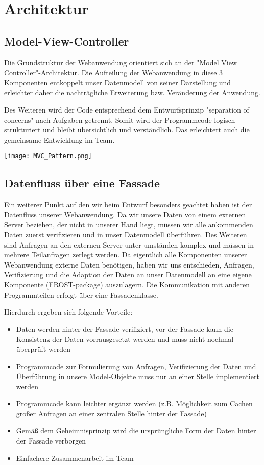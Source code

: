 \section{Architektur}

\subsection{Model-View-Controller}
Die Grundstruktur der Webanwendung orientiert sich an der "Model View Controller"-Architektur. Die Aufteilung der Webanwendung in diese 3 Komponenten entkoppelt unser Datenmodell von seiner Darstellung und erleichter daher die nachträgliche Erweiterung bzw. Veränderung der Anwendung.

Des Weiteren wird der Code entsprechend dem Entwurfsprinzip "separation of concerns" nach Aufgaben getrennt. Somit wird der Programmcode logisch strukturiert und bleibt übersichtlich und verständlich. Das erleichtert auch die gemeinsame Entwicklung im Team.

\vspace{5mm}

\texttt{[image: MVC\_Pattern.png]}

\newpage

\subsection{Datenfluss über eine Fassade}
Ein weiterer Punkt auf den wir beim Entwurf besonders geachtet haben ist der Datenfluss unserer Webanwendung. Da wir unsere Daten von einem externen Server beziehen, der nicht in unserer Hand liegt, müssen wir alle ankommenden Daten zuerst verifizieren und in unser Datenmodell überführen. Des Weiteren sind Anfragen an den externen Server unter umständen komplex und müssen in mehrere Teilanfragen zerlegt werden.
Da eigentlich alle Komponenten unserer Webanwendung externe Daten benötigen, haben wir uns entschieden, Anfragen, Verifizierung und die Adaption der Daten an unser Datenmodell an eine eigene Komponente (FROST-package) auszulagern. Die Kommunikation mit anderen Programmteilen erfolgt über eine Fassadenklasse.

Hierdurch ergeben sich folgende Vorteile:
\begin{itemize}
    \item Daten werden hinter der Fassade verifiziert, vor der Fassade kann die Konsistenz der Daten vorrausgesetzt werden und muss nicht nochmal überprüft werden
    \item Programmcode zur Formulierung von Anfragen, Verifizierung der Daten und Überführung in unsere Model-Objekte muss nur an einer Stelle implementiert werden
    \item Programmcode kann leichter ergänzt werden (z.B. Möglichkeit zum Cachen großer Anfragen an einer zentralen Stelle hinter der Fassade)
    \item Gemäß dem Geheimnisprinzip wird die ursprüngliche Form der Daten hinter der Fassade verborgen
    \item Einfachere Zusammenarbeit im Team
\end{itemize}